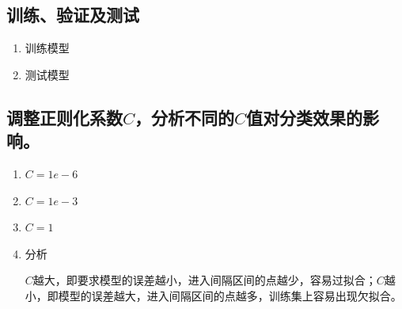 \documentclass[a4paper]{article}
\begin{document}
\subsection{训练、验证及测试}
\begin{enumerate}
    \item 训练模型
    \item 测试模型
\end{enumerate}

\subsection{调整正则化系数$C$，分析不同的$C$值对分类效果的影响。}
\begin{enumerate}
    \item $C = 1e-6$
    \item $C = 1e-3$
    \item $C = 1$
    \item 分析
    
    $C$越大，即要求模型的误差越小，进入间隔区间的点越少，容易过拟合；$C$越小，即模型的误差越大，进入间隔区间的点越多，训练集上容易出现欠拟合。
\end{enumerate}
\end{document}
